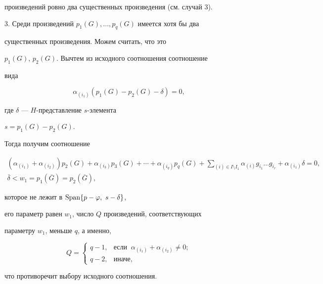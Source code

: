 \begin{pf}
произведений ровно два существенных произведения (см. случай 3).





3. Среди произведений $p_{1}(G),\dotsc,p_{q}(G)$ имеется хотя бы два


существенных произведения. Можем считать, что это


$p_{1}(G)$, $p_{2}(G)$. Вычтем из исходного соотношения соотношение


вида


$$


\alpha_{(i_{1})}(p_{1}(G)-p_{2}(G)-\delta)=0,


$$


где $\delta$ --- $H$-представление $s$-элемента


$s=p_{1}(G)-p_{2}(G)$.


Тогда получим соотношение


\begin{gather*}


(\alpha_{(i_{1})}+\alpha_{(i_{2})})p_{2}(G)+\alpha_{(i_{3})}p_{3}(G)+


\dotsb+\alpha_{(i_{q})}p_{q}(G)+


\sum_{(i)\in I\setminus I_{1}}\alpha_{(i)}g_{i_{1}}\dotsc g_{i_{r}}+


\alpha_{(i_{1})}\delta=0,\\


%


\overline{\delta}<w_{1}=p_{1}(\overline{G})=p_{2}(\overline{G}),


\end{gather*}


которое не лежит в $\operatorname{Span}\lbrace p-\varphi,\ s-\delta\rbrace$,


его параметр равен $w_{1}$, число $Q$ произведений, соответствующих 


параметру $w_{1}$, меньше $q$, а именно, 


$$


Q=


\begin{cases}


q-1,& \text{если }\ \alpha_{(i_{1})}+\alpha_{(i_{2})}\ne 0;\\


q-2,& \text{иначе},


\end{cases}


$$


что противоречит выбору исходного соотношения. 


\end{pf}





